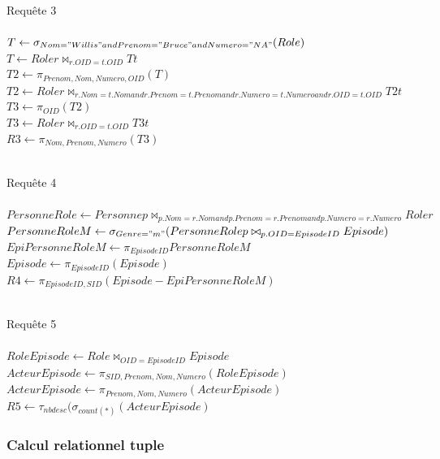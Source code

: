 \documentclass[10pt,a4paper]{article}
\begin{document}
\begin{list}{*}{}
\item Requête 3
\\ \\ 
$ T \leftarrow \sigma_{Nom = "Willis" and Prenom = "Bruce" and Numero = "NA"}(Role)$ \\ 
$T \leftarrow Role r \bowtie_{r.OID = t.OID} T  t$ \\
$T2 \leftarrow \pi_{Prenom, Nom, Numero, OID}(T)$\\
$T2 \leftarrow Role r \bowtie_{r.Nom = t.Nom and r.Prenom = t.Prenom and r.Numero = t.Numero and r.OID = t.OID} T2 t$\\
$T3 \leftarrow \pi_{OID} (T2)$\\
$T3 \leftarrow Role r \bowtie_{r.OID = t.OID} T3 t$ \\
$R3 \leftarrow \pi_{Nom, Prenom, Numero} (T3)$
\\
\\
\item Requête 4
\\ \\
$PersonneRole \leftarrow Personne p \bowtie_{p.Nom = r.Nom and p.Prenom = r.Prenom and p.Numero = r.Numero} Role r$\\
$PersonneRoleM \leftarrow \sigma_{Genre = "m"}(PersonneRole p \bowtie_{p.OID = EpisodeID} Episode)$\\
$EpiPersonneRoleM \leftarrow \pi_{EpisodeID} PersonneRoleM$\\
$Episode \leftarrow \pi_{EpisodeID}(Episode)$\\
$R4 \leftarrow \pi_{EpisodeID, SID}(Episode - EpiPersonneRoleM)$
\\
\\
\item Requête 5
\\ \\
$RoleEpisode \leftarrow Role \bowtie_{OID = EpisodeID}Episode$
$ActeurEpisode \leftarrow \pi_{SID, Prenom, Nom, Numero}(RoleEpisode)$\\
$ActeurEpisode \leftarrow \pi_{Prenom, Nom, Numero}(ActeurEpisode)$\\
$R5 \leftarrow \tau_{nb desc}(\sigma_{count(*)}(ActeurEpisode)$
\end{list}
\newpage
\subsubsection{Calcul relationnel tuple}
\end{document}
